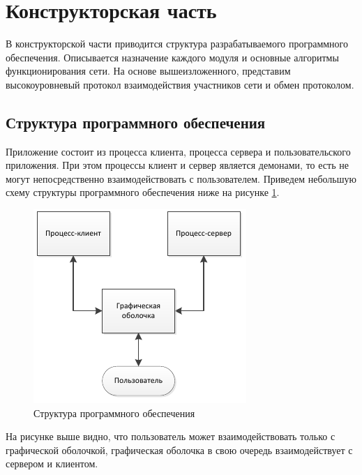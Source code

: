 \section{Конструкторская часть}
В конструкторской части приводится структура разрабатываемого
программного обеспечения. Описывается назначение каждого модуля и
основные алгоритмы функционирования сети. На основе вышеизложенного,
представим высокоуровневый протокол взаимодействия участников сети и
обмен протоколом.

\subsection{Структура программного обеспечения}
Приложение состоит из процесса клиента, процесса сервера и
пользовательского приложения. При этом процессы клиент и сервер является
демонами, то есть не могут непосредственно взаимодействовать с
пользователем. Приведем небольшую схему структуры программного
обеспечения ниже на рисунке \ref{pic_1}.
\begin{figure}[!hbt]
    \centering
    \includegraphics{pic_1}
    \caption{Структура программного обеспечения}\label{pic_1}
\end{figure}

На рисунке выше видно, что пользователь может взаимодействовать только с
графической оболочкой, графическая оболочка в свою очередь
взаимодействует с сервером и клиентом.

